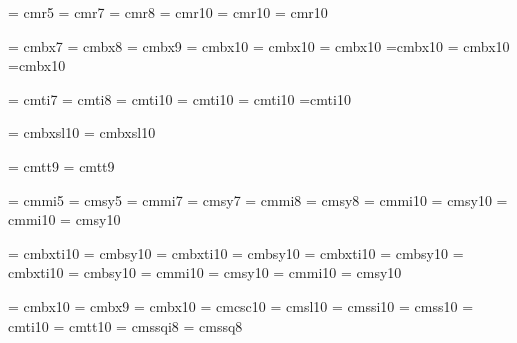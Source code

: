 \Font\prmfive	= cmr5
\Font\prmseven	= cmr7
\Font\prmeight	= cmr8
\Font\prmten	= cmr10
\Font\prmeleven = cmr10 \sc \mh
\Font\prmtwelve = cmr10 \sc \mi

\Font\prbseven	= cmbx7
\Font\prbeight	= cmbx8
\Font\prbnine	= cmbx9
\Font\prbten	= cmbx10
\Font\prbeleven = cmbx10 \sc \mh
\Font\prbtwelve = cmbx10 \sc \mi
\Font\prbfourteen=cmbx10 \sc \mii
\Font\prbsixteen= cmbx10 \sc \miii
\Font\prbeighteen=cmbx10 \sc \miii

\Font\priseven	= cmti7
\Font\prieight	= cmti8
\Font\priten	= cmti10
\Font\prieleven = cmti10 \sc \mh
\Font\pritwelve = cmti10 \sc \mi
\Font\prifourteen=cmti10 \sc \mii

\Font\prbiten	= cmbxsl10
\Font\prbieleven= cmbxsl10 \sc \mh

\Font\lgseven	= cmtt9
\Font\lgnine	= cmtt9

\font\mifive	= cmmi5			\font\syfive	= cmsy5
\font\miseven	= cmmi7			\font\syseven	= cmsy7
\font\mieight	= cmmi8			\font\syeight	= cmsy8
\font\miten	= cmmi10		\font\syten	= cmsy10
\font\mieleven	= cmmi10 \sc \mh	\font\syeleven	= cmsy10 \sc \mh

\font\bmiten	 = cmbxti10		\font\bsyten	 = cmbsy10
\font\bmieleven	 = cmbxti10 \sc \mh	\font\bsyeleven	 = cmbsy10 \sc \mh
\font\bmitwelve	 = cmbxti10 \sc \mi	\font\bsytwelve	 = cmbsy10 \sc \mi
\font\bmifourteen= cmbxti10 \sc \mii	\font\bsyfourteen= cmbsy10 \sc \mii
\font\bmisixteen = cmmi10 \sc \miii	\font\bsysixteen = cmsy10  \sc \miii
\font\bmieighteen= cmmi10 \sc \miii	\font\bsyeighteen= cmsy10  \sc \miii


\font\bbften = cmbx10
\font\bbfnine = cmbx9
\Font\bbflten = cmbx10 \sc \mi
\font\bscten = cmcsc10
\font\bslten = cmsl10
\font\ssiten = cmssi10
\font\bssten = cmss10
\font\bitten = cmti10
\font\bttten = cmtt10
\font\ssqieight = cmssqi8
\font\ssqeight = cmssq8
